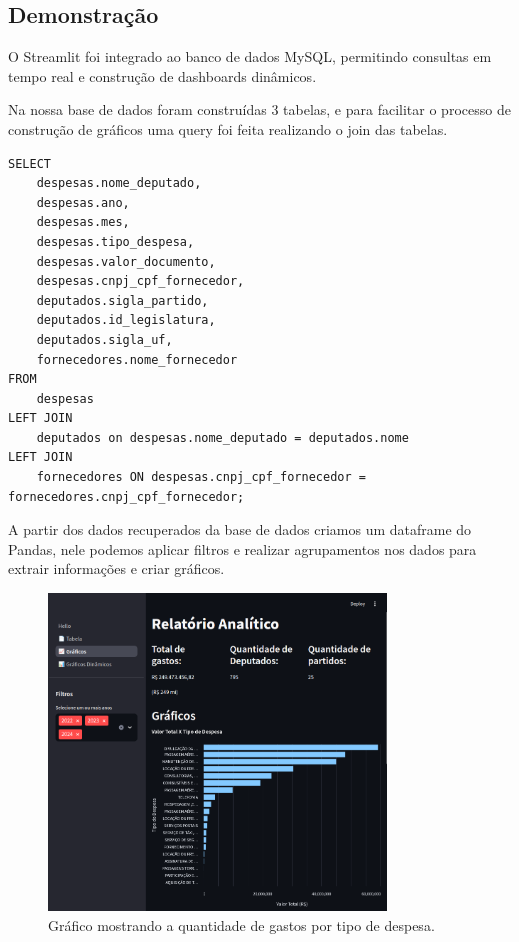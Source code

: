 \documentclass[12pt, a4paper]{article}
\begin{document}
\subsection{Demonstração}

O Streamlit foi integrado ao banco de dados MySQL, permitindo consultas em tempo real e construção de dashboards dinâmicos.

Na nossa base de dados foram construídas 3 tabelas, e para facilitar o processo de construção de gráficos uma query foi feita realizando o join das tabelas.

\begin{verbatim}
SELECT
	despesas.nome_deputado,
	despesas.ano,
	despesas.mes,
	despesas.tipo_despesa,
	despesas.valor_documento,
	despesas.cnpj_cpf_fornecedor,
	deputados.sigla_partido,
	deputados.id_legislatura,
	deputados.sigla_uf,
	fornecedores.nome_fornecedor
FROM
	despesas
LEFT JOIN
	deputados on despesas.nome_deputado = deputados.nome
LEFT JOIN
	fornecedores ON despesas.cnpj_cpf_fornecedor = fornecedores.cnpj_cpf_fornecedor;
\end{verbatim}

A partir dos dados recuperados da base de dados criamos um dataframe do Pandas\cite{Pandas}, nele podemos aplicar filtros e realizar agrupamentos nos dados para extrair informações e criar gráficos.


\begin{figure}[!htbp]
	\centering
	\includegraphics[width=0.8\textwidth]{assets/2_plot1.png}
	\caption{Gráfico mostrando a quantidade de gastos por tipo de despesa.}
	\label{fig:criacao_postgresql}
\end{figure}
\end{document}
